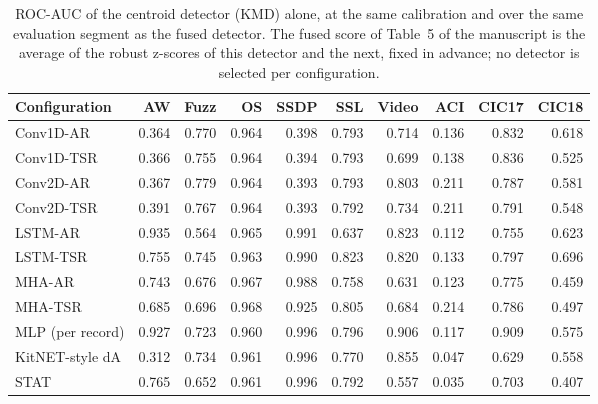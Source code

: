 \begin{table}[ht]\centering\footnotesize\setlength{\tabcolsep}{3.5pt}
\begin{tabular}{lrrrrrrrrr}
\hline
\textbf{Configuration} & \textbf{AW} & \textbf{Fuzz} & \textbf{OS} & \textbf{SSDP} & \textbf{SSL} & \textbf{Video} & \textbf{ACI} & \textbf{CIC17} & \textbf{CIC18}\\
\hline
Conv1D-AR & 0.364 & 0.770 & 0.964 & 0.398 & 0.793 & 0.714 & 0.136 & 0.832 & 0.618\\
Conv1D-TSR & 0.366 & 0.755 & 0.964 & 0.394 & 0.793 & 0.699 & 0.138 & 0.836 & 0.525\\
Conv2D-AR & 0.367 & 0.779 & 0.964 & 0.393 & 0.793 & 0.803 & 0.211 & 0.787 & 0.581\\
Conv2D-TSR & 0.391 & 0.767 & 0.964 & 0.393 & 0.792 & 0.734 & 0.211 & 0.791 & 0.548\\
LSTM-AR & 0.935 & 0.564 & 0.965 & 0.991 & 0.637 & 0.823 & 0.112 & 0.755 & 0.623\\
LSTM-TSR & 0.755 & 0.745 & 0.963 & 0.990 & 0.823 & 0.820 & 0.133 & 0.797 & 0.696\\
MHA-AR & 0.743 & 0.676 & 0.967 & 0.988 & 0.758 & 0.631 & 0.123 & 0.775 & 0.459\\
MHA-TSR & 0.685 & 0.696 & 0.968 & 0.925 & 0.805 & 0.684 & 0.214 & 0.786 & 0.497\\
MLP (per record) & 0.927 & 0.723 & 0.960 & 0.996 & 0.796 & 0.906 & 0.117 & 0.909 & 0.575\\
KitNET-style dA & 0.312 & 0.734 & 0.961 & 0.996 & 0.770 & 0.855 & 0.047 & 0.629 & 0.558\\
STAT & 0.765 & 0.652 & 0.961 & 0.996 & 0.792 & 0.557 & 0.035 & 0.703 & 0.407\\
\hline
\end{tabular}
\caption{ROC-AUC of the centroid detector (KMD) alone, at the same calibration and over the same evaluation segment as the fused detector. The fused score of Table~5 of the manuscript is the average of the robust z-scores of this detector and the next, fixed in advance; no detector is selected per configuration.}\label{tab:s_kmd}
\end{table}

